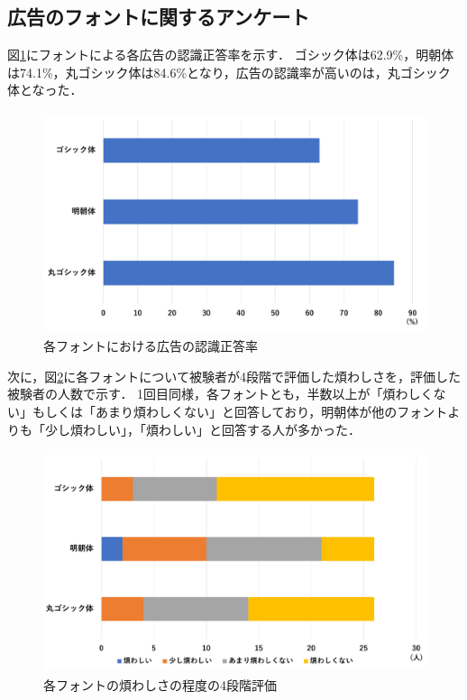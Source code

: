 \documentclass[12pt,a4j,titlepage]{ltjsarticle}
\begin{document}
\subsection{広告のフォントに関するアンケート}
図\ref{fig:広告認識正答率_2}にフォントによる各広告の認識正答率を示す．
ゴシック体は62.9\%，明朝体は74.1\%，丸ゴシック体は84.6\%となり，広告の認識率が高いのは，丸ゴシック体となった．

\begin{figure}[H]
\begin{center}
 \includegraphics[height=65mm]{figures/広告認識正答率_2.pdf}
\end{center}
 \caption{各フォントにおける広告の認識正答率}
 \label{fig:広告認識正答率_2}
\end{figure}

次に，図\ref{fig:煩わしさ_2}に各フォントについて被験者が4段階で評価した煩わしさを，評価した被験者の人数で示す．
1回目同様，各フォントとも，半数以上が「煩わしくない」もしくは「あまり煩わしくない」と回答しており，明朝体が他のフォントよりも「少し煩わしい」，「煩わしい」と回答する人が多かった．

\begin{figure}[H]
\begin{center}
 \includegraphics[height=65mm]{figures/煩わしさ_2.pdf}
\end{center}
 \caption{各フォントの煩わしさの程度の4段階評価}
 \label{fig:煩わしさ_2}
\end{figure}
\end{document}
